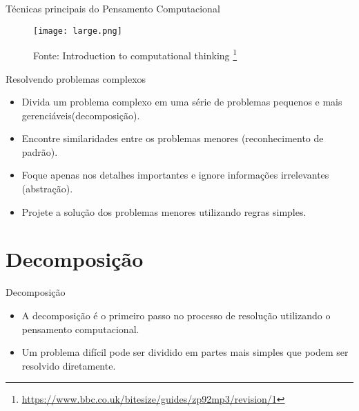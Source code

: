 \documentclass{beamer}
\begin{document}
\begin{frame}{Técnicas principais do Pensamento Computacional}


\begin{figure}
\begin{center}
	\texttt{[image: large.png]} 
\end{center}
\caption{Fonte: Introduction to computational thinking \footnote{\url{https://www.bbc.co.uk/bitesize/guides/zp92mp3/revision/1}}}
\end{figure}



\end{frame}

\begin{frame}{Resolvendo problemas complexos}

\begin{itemize}

\item Divida um problema complexo em uma série de problemas pequenos e mais gerenciáveis(decomposição).
\item Encontre similaridades entre os problemas menores (reconhecimento de padrão).
\item Foque apenas nos detalhes importantes e ignore informações irrelevantes (abstração).
\item Projete a solução dos problemas menores utilizando regras simples. 
\end{itemize}

\end{frame}


\section{Decomposição}

\begin{frame}{Decomposição}

\begin{itemize}
    \item A decomposição é o primeiro passo no processo de resolução utilizando o pensamento computacional.
    \item Um problema difícil pode ser dividido em partes mais simples que podem ser resolvido diretamente.
\end{itemize}

\end{frame}
\end{document}
